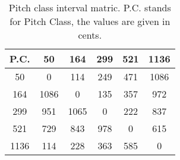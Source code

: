 \begin{table}
\begin{tabular}{c||  c  c  c  c  c  }	
P.C. & 50 & 164 & 299 & 521 & 1136 \\
\hline
\hline
50 & 0 & 114 & 249 & 471 & 1086\\
164 & 1086 & 0 & 135 & 357 & 972\\
299 & 951 & 1065 & 0 & 222 & 837\\
521 & 729 & 843 & 978 & 0 & 615\\
1136 & 114 & 228 & 363 & 585 & 0     	
\end{tabular}
\label{tbl:pitch_class_interval_matrix}
\caption{Pitch class interval matric. P.C. stands for Pitch Class, the values are given in cents.}
\end{table}
